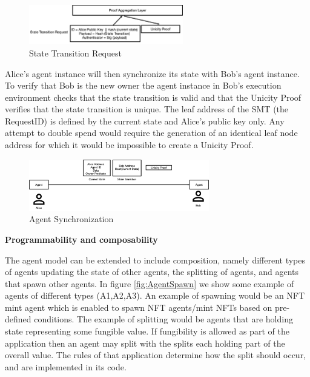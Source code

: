 \documentclass{article}
\begin{document}
\begin{figure}[H]
    \centering
    \includegraphics[width=0.6\textwidth]{STR.png}
    \caption{State Transition Request}
    \label{fig:STR}
\end{figure}




Alice's agent instance will then synchronize its state with Bob's agent instance. To verify that Bob is the new owner the agent instance in Bob's execution environment checks that the state transition is valid and that the Unicity Proof verifies that the state transition is unique. The leaf address of the SMT (the RequestID) is defined by the current state and Alice’s public key only.  Any attempt to double spend would require the generation of an identical leaf node address for which it would be impossible to create a Unicity Proof.

\vspace{2mm}

\begin{figure}[H]
    \centering
    \includegraphics[width=0.7\textwidth]{AgentSynchronization.png}
    \caption{Agent Synchronization}
    \label{fig:AgentSynch}
\end{figure}

\vspace{2mm}

\textbf{Programmability and composability}

\vspace{2mm}

The agent model can be extended to include composition, namely different types of agents updating the state of other agents, the splitting of agents, and agents that spawn other agents. In figure \ref{fig:AgentSpawn} we show some example of agents of different types (A1,A2,A3). An example of spawning would be an NFT mint agent which is enabled to spawn NFT agents/mint NFTs based on pre-defined conditions. The example of splitting would be agents that are holding state representing some fungible value. If fungibility is allowed as part of the application then an agent may split with the splits each holding part of the overall value. The rules of that application determine how the split should occur, and are implemented in its code.
\end{document}
